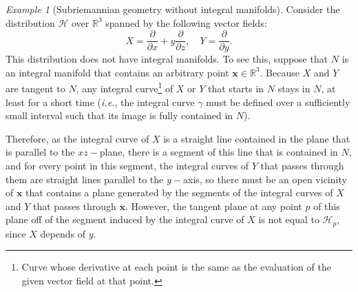 \documentclass[12pt, letterpaper, reqno]{amsart}
\theoremstyle{definition}
\theoremstyle{plain}
\theoremstyle{remark}
\newtheorem{ex}{Example}
\begin{document}
\begin{ex}[Subriemannian geometry without integral manifolds] 
	Consider the distribution $ \mathcal{H} $ over $ \mathbb{R}^3 $ spanned by the following vector fields: 
	$$ X = \frac{\partial}{\partial x} + y \frac{\partial}{\partial z}, \quad Y = \frac{\partial}{\partial y}.  $$ 
	This distribution does not have integral manifolds. To see this, suppose that $ N $ is an integral manifold that contains an arbitrary point $ \textbf{x} \in \mathbb{R}^3.  $ Because $ X $ and $ Y $ are tangent to $ N $, any integral curve\footnote{Curve whose derivative at each point is the same as the evaluation of the given vector field at that point.} of $ X $ or $ Y $ that starts in $ N $ stays in $ N $, at least for a short time (\textit{i.e.}, the integral curve $ \gamma $ must be defined over a sufficiently small interval such that its image is fully contained in $ N $).   

	Therefore, as the integral curve of $ X $ is a straight line contained in the plane that is parallel to the $ xz- $plane, there is a segment of this line that is contained in $ N $, and for every point in this segment, the integral curves of $ Y $ that passes through them are straight lines parallel to the $ y- $axis, so there must be an open vicinity of $ \textbf{x}  $ that contains a plane generated by the segments of the integral curves of $ X $ and $ Y $ that passes through $ \textbf{x}.  $ However, the tangent plane at any point $ p $  of this plane  off of the segment induced by the integral curve of $ X $ is not equal to $ \mathcal{H}_p, $ since $ X $ depends of $ y $.   
\end{ex}

\nocite{*}

\end{document}
